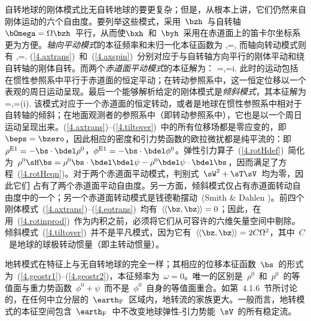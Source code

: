 {自转地球的刚体模式比无自转地球的要更复杂；但是，从根本上讲，它们仍然来自刚体运动的六个自由度。要列举这些模式，采用~$\bzh$~与自转轴~$\bOmega=\Omega\bzh$~平行，从而使$\bxh$~和~$\byh$~采用在赤道面上的笛卡尔坐标系更为方便。{\em 轴向平动模式\/}的本征频率和未归一化本征函数为
%
%
%
%
\eq
\label{4.axtrans}
,\qquad\bs=\bzh,
\en
而轴向转动模式则有
\eq
\label{4.axspin}
,\qquad\bs=\bzh\times\bx.
\en
(\ref{4.axtrans})~和~(\ref{4.axspin})~分别对应于与自转轴方向平行的刚体平动和绕自转轴的刚体自转。而两个{\em 赤道面平动模式\/}的本征解为：
%
%
%
%
\eq
\label{4.eqtrans}
\omega=\pm\Omega,\qquad\bs=\bxh\pm i\byh.
\en
此时的运动包括在惯性参照系中平行于赤道面的恒定平动；在转动参照系中，这一恒定位移以一个表观的周日运动呈现。最后一个能够解析给定的刚体模式是{\em 倾斜模式\/}，其本征解为
%
%
\eq
\label{4.tiltover}
\omega=\pm\Omega,\qquad\bs=(\bxh\pm i\byh)\times\bx.
\en
该模式对应于一个赤道面的恒定转动，或者是地球在惯性参照系中相对于自转轴的倾斜；在地面观测者的参照系中（即转动参照系中），它也是以一个周日运动呈现出来。(\ref{4.axtrans})--(\ref{4.tiltover})~中的所有位移场都是零应变的，即$\beps=\bzero$，因此相应的密度和引力势函数的欧拉微扰都是纯平流的：即$\rho^{\rm E1}=-\bs\cdot\bdel\rho^0$，$\phi^{\rm E1}=-\bs\cdot\bdel\phi^0$。弹性引力算子~(\ref{4.rotHdef})~简化为~$\rho^0\sH\bs=\rho^0\bs\cdot\bdel\bdel\psi-\rho^0\bdel\psi\cdot\bdel\bs$，因而满足了方程~(\ref{4.rotHeqn})。对于两个赤道面平动模式，判别式~$\sW^2+\sT\sV$~均为零，因此它们
占有了两个赤道面平动自由度。另一方面，倾斜模式仅占有赤道面转动自由度中的一个；另一个赤道面转动模式是钱德勒摆动~(Smith \& Dahlen \citeyear{smith&dahlen81})。前四个刚体模式~(\ref{4.axtrans})--(\ref{4.eqtrans})~均有~$\langle_{\!}\langle \bz,\bz\rangle_{\!}\rangle=0$；因此，在用~(\ref{4.rotinprod})~作为内积之前，必须将它们从可容许的六维矢量空间中剔除。倾斜模式~(\ref{4.tiltover})~并不是平凡模式，因为它有~$\langle_{\!}\langle
\bz,\bz\rangle_{\!}\rangle=2C\Omega^2$，其中~$C$~是地球的球极转动惯量（即主转动惯量）。

地转模式在特征上与无自转地球的完全一样；其相应的位移本征函数~$\bs$~的形式为~(\ref{4.geostr1})--(\ref{4.geostr2})，本征频率为~$\omega=0$。唯一的区别是~$\rho^0$~和~$p^0$~的等值面与重力势函数~$\phi^0+\psi$~而不是~$\phi^0$~自身的等值面重合。如第~4.1.6~节所讨论的，在任何中立分层的~$\earth_{\rm F}$~区域内，地转流的家族更大。一般而言，地转模式的本征空间包含~$\earth_{\rm F}$~中不改变地球弹性-引力势能~$\sV$~的所有稳定流。
%
%
%
%

}
